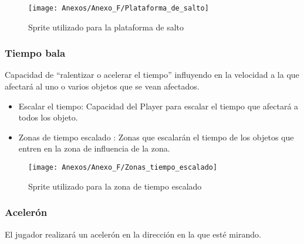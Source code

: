 \begin{figure}[h]
\centering
\texttt{[image: Anexos/Anexo\_F/Plataforma\_de\_salto]}
\caption{Sprite utilizado para la plataforma de salto}
\end{figure}

\clearpage
\subsubsection{Tiempo bala}
Capacidad de “ralentizar o acelerar el tiempo” influyendo en la velocidad a la que afectará al uno o varios objetos que se vean afectados.
\begin{itemize}
\item
Escalar el tiempo: Capacidad del Player para escalar el tiempo que afectará a todos los objeto.
\item
Zonas de tiempo escalado \footnotemark : Zonas que escalarán el tiempo de los objetos que entren en la zona de influencia de la zona.
\end{itemize}
\begin{figure}[h]
\centering
\texttt{[image: Anexos/Anexo\_F/Zonas\_tiempo\_escalado]}
\caption{Sprite utilizado para la zona de tiempo escalado}
\end{figure}

\subsubsection{Acelerón}
El jugador realizará un acelerón en la dirección en la que esté mirando.


